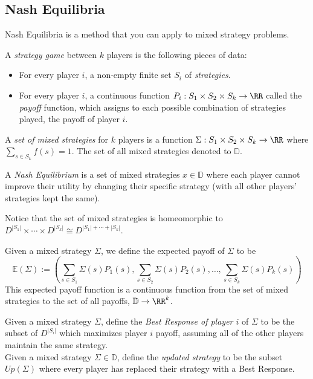 \subsection{Nash Equilibria}
Nash Equilibria is a method that you can apply to mixed strategy problems.
\begin{definition}
	A \emph{strategy game} between $k$ players is the following pieces of data:
	\begin{itemize}
		\item For every player $i$,   a non-empty finite set $S_i$ of \emph{strategies}.
		\item For every player $i$,  a continuous function $P_i: S_1\times S_2\times  S_k\to \RR$ called the \emph{payoff} function,  which assigns to each possible combination of strategies played,  the payoff of player $i$. 
	\end{itemize}
\end{definition}
\begin{definition}
	A \emph{set of mixed strategies} for $k$ players is a function $\Sigma: S_1\times S_2\times S_k\to \RR$ where $\sum_{s\in S_k} f(s)=1$. The set of all mixed strategies denoted to $\mathbb D$. 
\end{definition}
\begin{definition}
	A \emph{Nash Equilibrium} is a set of mixed strategies $x\in \mathbb D$ where each player cannot improve their utility by changing their specific strategy (with all other players' strategies kept the same). 
\end{definition}

Notice that the set of mixed strategies is homeomorphic to $D^{|S_1|}\times \cdots \times D^{|S_k|}\cong D^{|S_1|+\cdots +|S_k|}$. 
\begin{definition}
	Given a mixed strategy $\Sigma$,  we define the expected payoff of $\Sigma$ to be 
	\[\mathbb{E}(\Sigma):= (\sum_{s\in S_1} \Sigma(s) P_1 (s),  \sum_{s\in S_2} \Sigma(s) P_2(s),  \ldots,  \sum_{s\in S_k} \Sigma(s) P_k(s))\]
	This expected payoff function is a continuous function from the set of mixed strategies to the set of all payoffs,   $\mathbb D \to \RR^k$. 
\end{definition}
\begin{definition}
	Given a mixed strategy $\Sigma$,  define the \emph{Best Response of player $i$} of $\Sigma$ to be the subset of $D^{|S_i|}$ which maximizes player $i$ payoff,  assuming all of the other players maintain the same strategy.\\
	Given a mixed strategy $\Sigma\in \mathbb D$,  define the \emph{updated strategy} to be the subset $Up(\Sigma)$ where every player has replaced their strategy with a Best Response. 
\end{definition}

